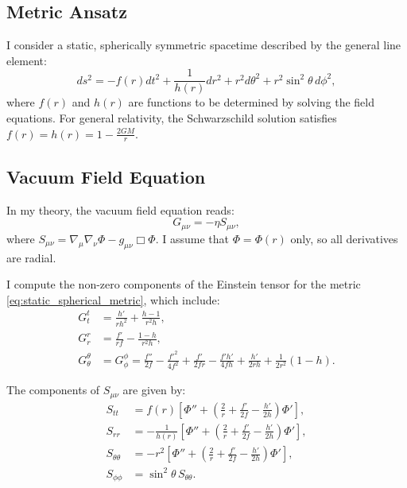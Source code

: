 \documentclass[12pt]{article}
\begin{document}
\subsection{Metric Ansatz}

I consider a static, spherically symmetric spacetime described by the general line element:
\begin{equation}
ds^2 = -f(r) dt^2 + \frac{1}{h(r)} dr^2 + r^2 d\theta^2 + r^2 \sin^2 \theta\, d\phi^2,
\label{eq:static_spherical_metric}
\end{equation}
where \( f(r) \) and \( h(r) \) are functions to be determined by solving the field equations. For general relativity, the Schwarzschild solution satisfies \( f(r) = h(r) = 1 - \frac{2GM}{r} \).

\subsection{Vacuum Field Equation}

In my theory, the vacuum field equation reads:
\begin{equation}
G_{\mu\nu} = -\eta S_{\mu\nu},
\end{equation}
where \( S_{\mu\nu} = \nabla_\mu \nabla_\nu \Phi - g_{\mu\nu} \Box \Phi \). I assume that \( \Phi = \Phi(r) \) only, so all derivatives are radial.

I compute the non-zero components of the Einstein tensor for the metric \eqref{eq:static_spherical_metric}, which include:
\begin{align}
G^t_t &= \frac{h'}{r h^2} + \frac{h - 1}{r^2 h}, \\
G^r_r &= \frac{f'}{r f} - \frac{1 - h}{r^2 h}, \\
G^\theta_\theta &= G^\phi_\phi = \frac{f''}{2 f} - \frac{f'^2}{4 f^2} + \frac{f'}{2 f r} - \frac{f' h'}{4 f h} + \frac{h'}{2 r h} + \frac{1}{2 r^2} (1 - h).
\end{align}

The components of \( S_{\mu\nu} \) are given by:
\begin{align}
S_{tt} &= f(r) \left[ \Phi'' + \left( \frac{2}{r} + \frac{f'}{2f} - \frac{h'}{2h} \right) \Phi' \right], \\
S_{rr} &= -\frac{1}{h(r)} \left[ \Phi'' + \left( \frac{2}{r} + \frac{f'}{2f} - \frac{h'}{2h} \right) \Phi' \right], \\
S_{\theta\theta} &= -r^2 \left[ \Phi'' + \left( \frac{2}{r} + \frac{f'}{2f} - \frac{h'}{2h} \right) \Phi' \right], \\
S_{\phi\phi} &= \sin^2\theta \, S_{\theta\theta}.
\end{align}
\end{document}
